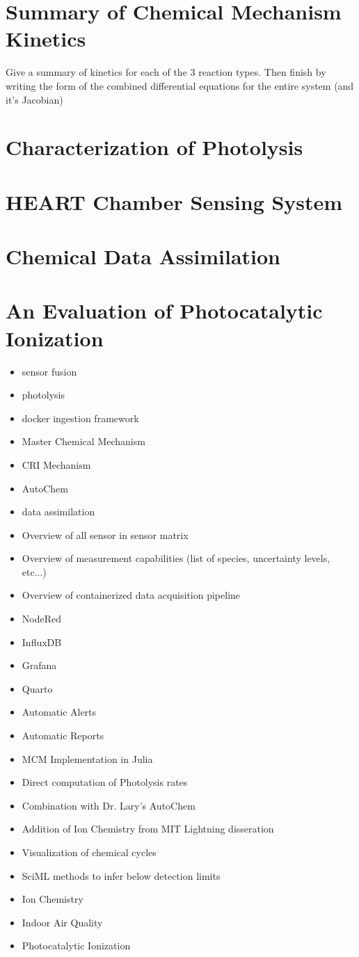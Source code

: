 \section{Summary of Chemical Mechanism Kinetics}

Give a summary of kinetics for each of the 3 reaction types. Then finish by writing the form of the combined differential equations for the entire system (and it's Jacobian)




\section{Characterization of Photolysis}
\section{HEART Chamber Sensing System}
\section{Chemical Data Assimilation}
\section{An Evaluation of Photocatalytic Ionization}



\begin{itemize}
\item sensor fusion
\item photolysis
\item docker ingestion framework
\item Master Chemical Mechanism
\item CRI Mechanism
\item AutoChem
\item data assimilation
\item Overview of all sensor in sensor matrix
\item Overview of measurement capabilities (list of species, uncertainty levels, etc...)
\item Overview of containerized data acquisition pipeline
\item NodeRed
\item InfluxDB
\item Grafana
\item Quarto
\item Automatic Alerts
\item Automatic Reports
\item MCM Implementation in Julia
\item Direct computation of Photolysis rates
\item Combination with Dr. Lary's AutoChem
\item Addition of Ion Chemistry from MIT Lightning disseration
\item Visualization of chemical cycles
\item SciML methods to infer below detection limits
\item Ion Chemistry
\item Indoor Air Quality
\item Photocatalytic Ionization
\end{itemize}


